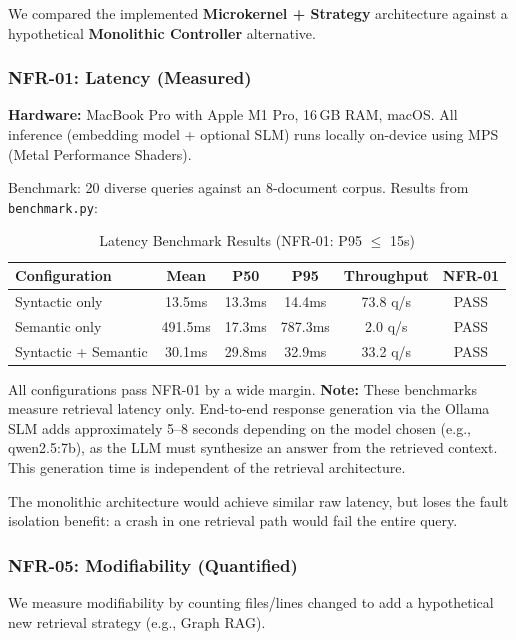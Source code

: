 \documentclass[11pt,a4paper]{article}
\begin{document}
We compared the implemented \textbf{Microkernel + Strategy} architecture against a hypothetical \textbf{Monolithic Controller} alternative.

\subsubsection{NFR-01: Latency (Measured)}

\textbf{Hardware:} MacBook Pro with Apple M1 Pro, 16\,GB RAM, macOS. All inference (embedding model + optional SLM) runs locally on-device using MPS (Metal Performance Shaders).

Benchmark: 20 diverse queries against an 8-document corpus. Results from \texttt{benchmark.py}:

\begin{table}[H]
\centering
\begin{tabular}{lccccc}
\toprule
\textbf{Configuration} & \textbf{Mean} & \textbf{P50} & \textbf{P95} & \textbf{Throughput} & \textbf{NFR-01} \\
\midrule
Syntactic only & 13.5ms & 13.3ms & 14.4ms & 73.8 q/s & PASS \\
Semantic only & 491.5ms & 17.3ms & 787.3ms & 2.0 q/s & PASS \\
Syntactic + Semantic & 30.1ms & 29.8ms & 32.9ms & 33.2 q/s & PASS \\
\bottomrule
\end{tabular}
\caption{Latency Benchmark Results (NFR-01: P95 $\leq$ 15s)}
\end{table}

All configurations pass NFR-01 by a wide margin. \textbf{Note:} These benchmarks measure retrieval latency only. End-to-end response generation via the Ollama SLM adds approximately 5--8 seconds depending on the model chosen (e.g., qwen2.5:7b), as the LLM must synthesize an answer from the retrieved context. This generation time is independent of the retrieval architecture.

The monolithic architecture would achieve similar raw latency, but loses the fault isolation benefit: a crash in one retrieval path would fail the entire query.

\subsubsection{NFR-05: Modifiability (Quantified)}

We measure modifiability by counting files/lines changed to add a hypothetical new retrieval strategy (e.g., Graph RAG).
\end{document}
